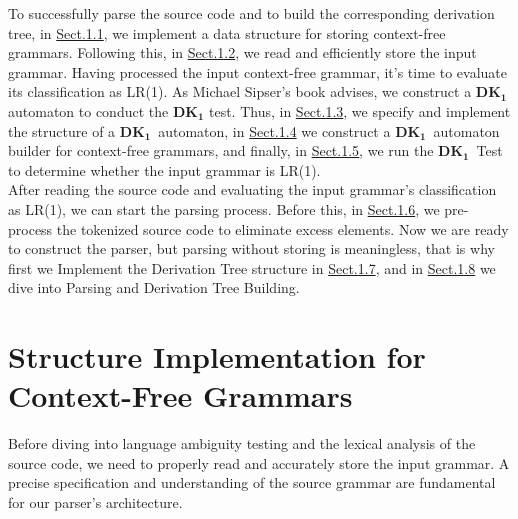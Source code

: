 To successfully parse the source code and to build the corresponding derivation tree, in \hyperref[sec:Structure Implementation for Context-Free Grammars]{Sect.1.1}, we implement a data structure for storing context-free grammars. Following this, in \hyperref[sec:Lexical Analysis and Tokenization]{Sect.1.2}, we read and efficiently store the input grammar. Having processed the input context-free grammar, it's time to evaluate its classification as LR(1). As Michael Sipser's book \cite{sipser} advises, we construct a \(\boldsymbol{DK_{1}}\) automaton to conduct the  \(\boldsymbol{DK_{1}}\) test. Thus, in \hyperref[sec:Structure Implementation of DK1 Automaton]{Sect.1.3}, we specify and implement the structure of a \(\boldsymbol{DK_{1}}\)\ automaton, in \hyperref[sec:DK1 Automaton Builder for a CFG]{Sect.1.4} we construct a \(\boldsymbol{DK_{1}}\)\ automaton builder for context-free grammars, and finally, in \hyperref[sec:DK1 Test]{Sect.1.5}, we run the \(\boldsymbol{DK_{1}}\)\ Test to determine whether the input grammar is LR(1).\\


After reading the source code and evaluating the input grammar's classification as LR(1), we can start the parsing process. Before this, in \hyperref[sec:Pre-processing for C0 Source Code]{Sect.1.6}, we pre-process the tokenized source code to eliminate excess elements. Now we are ready to construct the parser, but parsing without storing is meaningless, that is why first we Implement the Derivation Tree structure in \hyperref[sec:Derivation Tree Strucutre and Implementation]{Sect.1.7}, and in \hyperref[sec:Parsing and Derivation Tree Building]{Sect.1.8} we dive into Parsing and Derivation Tree Building.


\newpage


\section{Structure Implementation for Context-Free Grammars}\label{sec:Structure Implementation for Context-Free Grammars}

Before diving into language ambiguity testing and the lexical analysis of the source code, we need to properly read and accurately store the input grammar. A precise specification and understanding of the source grammar are fundamental for our parser’s architecture.\\

